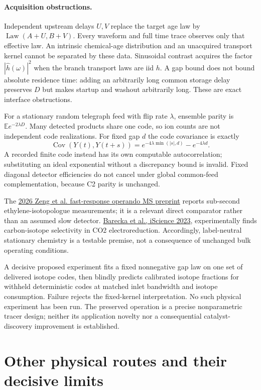\documentclass[11pt]{article}
\begin{document}
\paragraph{Acquisition obstructions.}
Independent upstream delays $U,V$ replace the target age law by $\operatorname{Law}(A+U,B+V)$. Every waveform and full time trace observes only that effective law. An intrinsic chemical-age distribution and an unacquired transport kernel cannot be separated by these data. Sinusoidal contrast acquires the factor $|\widehat h(\omega)|^2$ when the branch transport laws are iid $h$. A gap bound does not bound absolute residence time: adding an arbitrarily long common storage delay preserves $D$ but makes startup and washout arbitrarily long. These are exact interface obstructions.

For a stationary random telegraph feed with flip rate $\lambda$, ensemble parity is $\mathbb E e^{-2\lambda D}$. Many detected products share one code, so ion counts are not independent code realizations. For fixed gap $d$ the code covariance is exactly
\[
 \operatorname{Cov}(Y(t),Y(t+s))
       =e^{-4\lambda\min(|s|,d)}-e^{-4\lambda d}.
\]
A recorded finite code instead has its own computable autocorrelation; substituting an ideal exponential without a discrepancy bound is invalid. Fixed diagonal detector efficiencies do not cancel under global common-feed complementation, because C2 parity is unchanged.

The \href{https://escholarship.org/uc/item/89h9c1m9}{2026 Zeng et al. fast-response operando MS preprint} reports sub-second ethylene-isotopologue measurements; it is a relevant direct comparator rather than an assumed slow detector. \href{https://pmc.ncbi.nlm.nih.gov/articles/PMC10638474/}{Barecka et al., iScience 2023}, experimentally finds carbon-isotope selectivity in CO2 electroreduction. Accordingly, label-neutral stationary chemistry is a testable premise, not a consequence of unchanged bulk operating conditions.

A decisive proposed experiment fits a fixed nonnegative gap law on one set of delivered isotope codes, then blindly predicts calibrated isotope fractions for withheld deterministic codes at matched inlet bandwidth and isotope consumption. Failure rejects the fixed-kernel interpretation. No such physical experiment has been run. The preserved operation is a precise nonparametric tracer design; neither its application novelty nor a consequential catalyst-discovery improvement is established.

\section{Other physical routes and their decisive limits}\label{sec:physicalstops}
\end{document}
